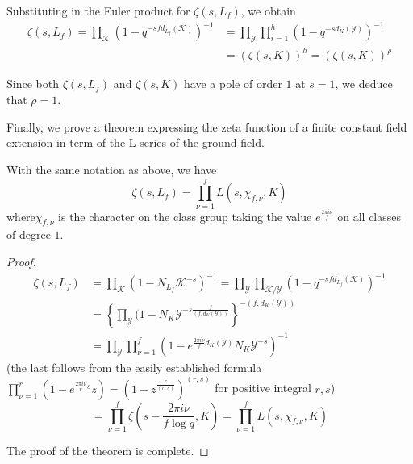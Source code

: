 Substituting in the Euler product for $\zeta (s, L_f)$, we obtain
\begin{align*}
  \zeta (s, L_f) = \prod _{\mathscr{K}} \left(1 - q^{-sf
    d_{L_f}(\mathscr{K})}\right)^{-1} &= \prod_\mathscr{Y} \prod^h_{i=1}
  \left(1-q^{-sd_K(\mathscr{Y})}\right)^{-1} \\ 
  & = (\zeta (s, K))^h = (\zeta (s, K))^\rho
\end{align*}

Since both $\zeta (s, L_f)$ and $\zeta(s, K)$ have a pole of order $1$
at $s = 1$, we deduce that $\rho = 1$. 

Finally, we prove a theorem expressing the zeta function of a finite
constant field extension in term of the L-series of the ground field. 

\begin{theorem*}
  With the same notation as above, we have
  $$
  \zeta (s, L_f) = \prod^f_{\nu =1} L (s, \chi_{f, \nu}, K)
  $$
  where\pageoriginale $\chi_{f, \nu}$ is the character on the class group taking the
  value $e^{\frac{2 \pi i \nu}{f}}$ on all classes of degree $1$. 
\end{theorem*}

\begin{proof}
  \begin{align*}
  \zeta (s, L_f) & = \prod_\mathscr{K}\left(1-N_{L_f} \mathscr{K}^{-s}\right)^{-1}
  = \prod_{\mathscr{Y}} \prod_{\mathscr{K}/
    \mathscr{Y}} \left(1-q^{-sfd_{L_f}(\mathscr{K})}\right)^{-1} \\
    &= \left\{ \prod_\mathscr{Y}(1-N_K \mathscr{Y}^{-s \frac{f}{(f,
        d_K(\mathscr{Y}))}}\right\}^{-(f, d_K(\mathscr{Y}))}\\ 
    &= \prod_\mathscr{Y} \prod^f_{\nu =1}\left(1 - e^{\frac{2 \pi i
        \nu}{f}d_K(\mathscr{Y})} N_K \mathscr{Y}^{-s}\right)^{-1} 
  \end{align*}
(the last follows from the easily established formula $
  \prod\limits^r_{\nu = 1}\left(1-e^{\frac{2 \pi i \nu}{r}s}z\right) =
  \left(1-z^{\frac{r}{(r, s)}}\right)^{(r, s)}$ for positive integral $r, s$) 
  $$
  = \prod^f_{\nu=1} \zeta \left(s-\frac{2 \pi i \nu}{f \log q}, K\right) =
  \prod^f_{\nu=1} L(s, \chi_{f, \nu}, K) 
  $$
  
  The proof of the theorem is complete.
\end{proof}

